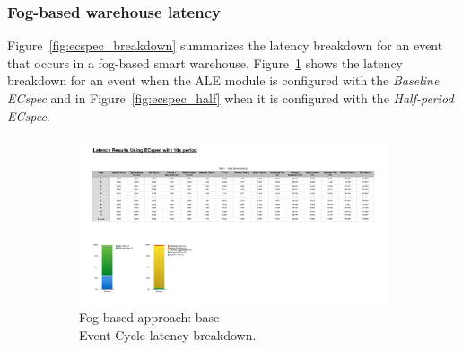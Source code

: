 \subsubsection{Fog-based warehouse latency}
\label{subs:eval_exp_latency_ecspec}
Figure~\ref{fig:ecspec_breakdown} summarizes the latency breakdown for an event that occurs in a fog-based
smart warehouse. Figure~\ref{fig:ecspec_base} shows the latency breakdown for an event when the
\gls{ALE} module is configured with the \textit{Baseline ECspec} and in Figure~\ref{fig:ecspec_half}
when it is configured with the \textit{Half-period ECspec}.\\

\begin{figure}[ht!]
 \centering
 \begin{subfigure}{.5\textwidth}
   \centering
   \includegraphics[height=\linewidth]{./images/edge_ecspec_breakdown}
   \caption{Fog-based approach: base\\Event Cycle latency breakdown.}
   \label{fig:ecspec_base}
 \end{subfigure}%
 \begin{subfigure}{.5\textwidth}
   \centering

\end{subfigure}
\end{figure}
